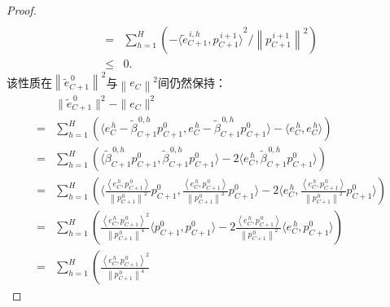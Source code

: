 \begin{proof}
\begin{align*}
    \\        
    ={}    & \sum_{h=1}^{H}
    \left(
    - {\langle \tilde{e}_{C+1}^{\, i,h}, p_{C+1}^{\, i+1} \rangle}^2 / \left\|p_{C+1}^{\, i+1}\right\|^{2}
    \right)                                                              \\
    \leq{} & 0 .
    \end{align*}
该性质在$\left\|\tilde{e}_{C+1}^{\, 0}\right\|^{2}$与$\left\|e_{C}\right\|^{2}$间仍然保持：
\begin{align*}
    & \|\tilde{e}_{C+1}^{\,0}\|^2-\|{e}_{C}\|^2 \\
    ={}    & \sum_{h=1}^{H}
    \left(
    \langle {e}_{C}^{\, h}-\tilde{\beta}_{C+1}^{\, 0,h} p_{C+1}^{0}
    ,
    {e}_{C}^{\, h}-\tilde{\beta}_{C+1}^{\, 0,h} p_{C+1}^{0} \rangle
    -
    \langle {e}_{C}^{\, h}, {e}_{C}^{\, h} \rangle
    \right)                                                              \\
    ={}    & \sum_{h=1}^{H}
    \left(
    \langle \tilde{\beta}_{C+1}^{\, 0,h} p_{C+1}^{0}
    ,
    \tilde{\beta}_{C+1}^{\, 0,h} p_{C+1}^{0} \rangle
    -
    2 \langle {e}_{C}^{\, h} , \tilde{\beta}_{C+1}^{\, 0,h} p_{C+1}^{0} \rangle
    \right)                                                              
    \\
    ={}    & \sum_{h=1}^{H}
    \left(
    \langle 
    \frac{\left\langle {e}_{C}^{\, h}, p_{C+1}^{\, 0}\right\rangle}{\left\|p_{C+1}^{\, 0}\right\|^{2}}  
    p_{C+1}^{0}
    ,
    \frac{\left\langle {e}_{C}^{\, h}, p_{C+1}^{\, 0}\right\rangle}{\left\|p_{C+1}^{\, 0}\right\|^{2}}  
    p_{C+1}^{0}
    \rangle
    -
    2 
    \langle 
    {e}_{C}^{\, h} 
    ,
    \frac{\left\langle {e}_{C}^{\, h}, p_{C+1}^{\, 0}\right\rangle}{\left\|p_{C+1}^{\, 0}\right\|^{2}}  
    p_{C+1}^{0} 
    \rangle
    \right)                                                              
    \\
    ={}    & \sum_{h=1}^{H}
    \left(
    \frac{{\left\langle {e}_{C}^{\, h}, p_{C+1}^{\, 0}\right\rangle}^2}{\left\|p_{C+1}^{\, 0}\right\|^{4}}  
    \langle 
    p_{C+1}^{0}
    ,
    p_{C+1}^{0}
    \rangle
    -
    2 \frac{\left\langle {e}_{C}^{\, h}, p_{C+1}^{\, 0}\right\rangle}{\left\|p_{C+1}^{\, 0}\right\|^{2}}  
    \langle {e}_{C}^{\, h} 
    ,
    p_{C+1}^{0} 
    \rangle
    \right)                                                              
    \\
    ={}    & \sum_{h=1}^{H}
    \left(
    \frac{{\left\langle {e}_{C}^{\, h}, p_{C+1}^{\, 0}\right\rangle}^2}{\left\|p_{C+1}^{\, 0}\right\|^{4}}  

\end{align*}
\end{proof}

